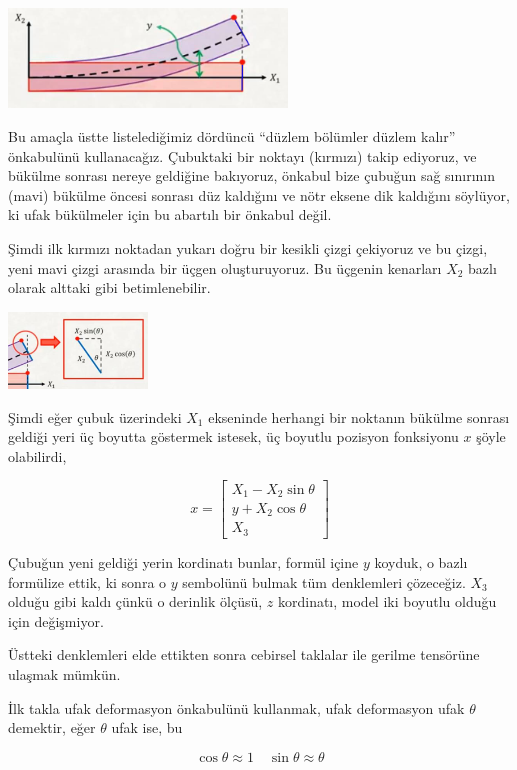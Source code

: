 \documentclass[12pt,fleqn]{article}\usepackage{../../common}
\begin{document}
\includegraphics[width=20em]{phy_020_strs_02_13.jpg}

Bu amaçla üstte listelediğimiz dördüncü ``düzlem bölümler düzlem kalır''
önkabulünü kullanacağız. Çubuktaki bir noktayı (kırmızı) takip ediyoruz, ve
bükülme sonrası nereye geldiğine bakıyoruz, önkabul bize çubuğun sağ sınırının
(mavi) bükülme öncesi sonrası düz kaldığını ve nötr eksene dik kaldığını
söylüyor, ki ufak bükülmeler için bu abartılı bir önkabul değil.

Şimdi ilk kırmızı noktadan yukarı doğru bir kesikli çizgi çekiyoruz ve bu çizgi,
yeni mavi çizgi arasında bir üçgen oluşturuyoruz. Bu üçgenin kenarları $X_2$
bazlı olarak alttaki gibi betimlenebilir.

\includegraphics[width=10em]{phy_020_strs_02_14.jpg}

Şimdi eğer çubuk üzerindeki $X_1$ ekseninde herhangi bir noktanın bükülme
sonrası geldiği yeri üç boyutta göstermek istesek, üç boyutlu pozisyon
fonksiyonu $x$ şöyle olabilirdi,

$$
x = \left[\begin{array}{c}
X_1 - X_2 \sin \theta \\ y + X_2 \cos\theta \\ X_3
\end{array}\right]
$$

Çubuğun yeni geldiği yerin kordinatı bunlar, formül içine $y$ koyduk, o bazlı
formülize ettik, ki sonra o $y$ sembolünü bulmak tüm denklemleri çözeceğiz.
$X_3$ olduğu gibi kaldı çünkü o derinlik ölçüsü, $z$ kordinatı, model iki
boyutlu olduğu için değişmiyor.

Üstteki denklemleri elde ettikten sonra cebirsel taklalar ile gerilme
tensörüne ulaşmak mümkün.

İlk takla ufak deformasyon önkabulünü kullanmak, ufak deformasyon ufak $\theta$
demektir, eğer $\theta$ ufak ise, bu

$$
\cos\theta \approx 1 \quad \sin\theta \approx \theta
$$
\end{document}
